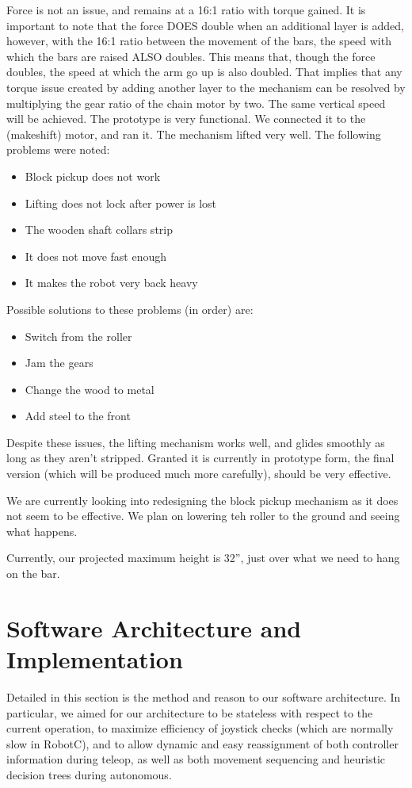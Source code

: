 \documentclass{article}
\begin{document}
Force is not an issue, and remains at a 16:1 ratio with torque gained. It is important to note that the force DOES double when an additional layer is added, however, with the 16:1 ratio between the movement of the bars, the speed with which the bars are raised ALSO doubles. This means that, though the force doubles, the speed at which the arm go up is also doubled. That implies that any torque issue created by adding another layer to the mechanism can be resolved by multiplying the gear ratio of the chain motor by two. The same vertical speed will be achieved.
The prototype is very functional. We connected it to the (makeshift) motor, and ran it. The mechanism lifted very well. The following problems were noted:
\begin{itemize}
\item Block pickup does not work
\item Lifting does not lock after power is lost
\item The wooden shaft collars strip
\item It does not move fast enough
\item It makes the robot very back heavy
\end{itemize}

Possible solutions to these problems (in order) are:
\begin{itemize}
\item Switch from the roller
\item Jam the gears
\item Change the wood to metal
\item Add steel to the front
\end{itemize}

Despite these issues, the lifting mechanism works well, and glides smoothly as long as they aren't stripped. Granted it is currently in prototype form, the final version (which will be produced much more carefully), should be very effective.

We are currently looking into redesigning the block pickup mechanism as it does not seem to be effective. We plan on lowering teh roller to the ground and seeing what happens. 

Currently, our projected maximum height is 32”, just over what we need to hang on the bar.

\newpage \section{Software Architecture and Implementation}
Detailed in this section is the method and reason to our software architecture. In particular, we aimed for our architecture to be stateless with respect to the current operation, to maximize efficiency of joystick checks (which are normally slow in RobotC), and to allow dynamic and easy reassignment of both controller information during teleop, as well as both movement sequencing and heuristic decision trees during autonomous.
\end{document}
